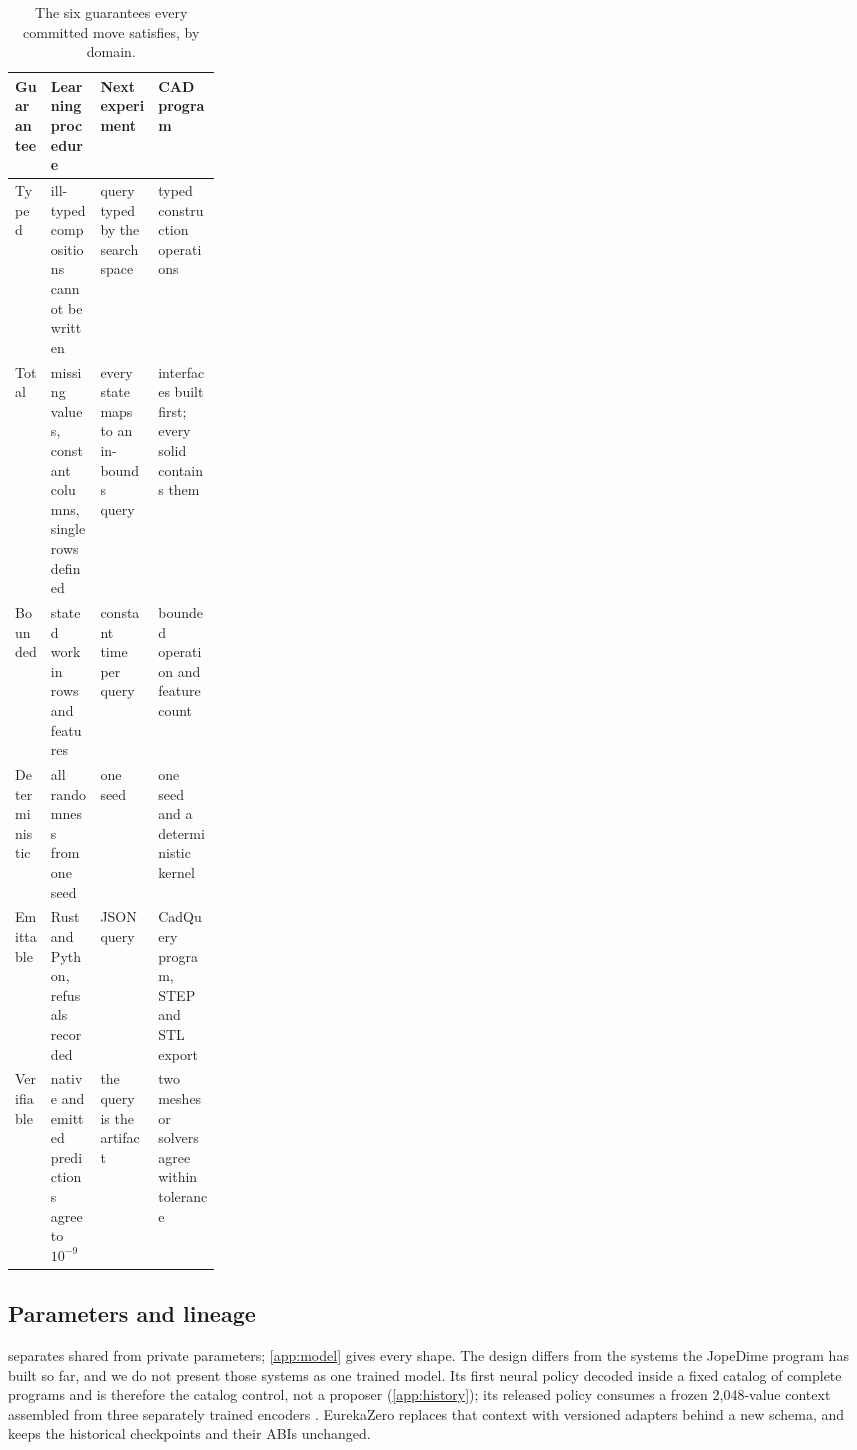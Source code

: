 \begin{table}[t]
\caption{The six guarantees every committed move satisfies, by domain.}
\label{tab:guarantees}
\centering\tablesf
\begin{tabularx}{\linewidth}{@{}l>{\raggedright\arraybackslash}p{0.24\linewidth}LL@{}}
\toprule
Guarantee & Learning procedure & Next experiment & CAD program \\
\midrule
Typed & ill-typed compositions cannot be written & query typed by the search space & typed construction operations \\
Total & missing values, constant columns, single rows defined & every state maps to an in-bounds query & interfaces built first; every solid contains them \\
Bounded & stated work in rows and features & constant time per query & bounded operation and feature count \\
Deterministic & all randomness from one seed & one seed & one seed and a deterministic kernel \\
Emittable & Rust and Python, refusals recorded & JSON query & CadQuery program, STEP and STL export \\
Verifiable & native and emitted predictions agree to $10^{-9}$ & the query is the artifact & two meshes or solvers agree within tolerance \\
\bottomrule
\end{tabularx}
\end{table}

\subsection{Parameters and lineage}

 separates shared from private parameters; \cref{app:model} gives every shape. The
design differs from the systems the JopeDime program has built so far, and we do not present those
systems as one trained model. Its first neural policy decoded inside a fixed catalog of complete
programs and is therefore the catalog control, not a proposer (\cref{app:history}); its released policy
consumes a frozen 2,048-value context assembled from three separately trained encoders \est. EurekaZero
replaces that context with versioned adapters behind a new schema, and keeps the historical
checkpoints and their ABIs unchanged.

